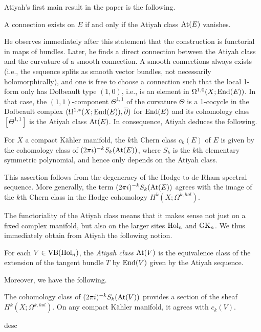 \documentclass[10pt]{amsart}
\begin{document}
Atiyah's first main result in the paper is the following.

\begin{prop}
A connection exists on $E$ if and only if the Atiyah class ${\rm At}(E)$ vanishes.
\end{prop}

He observes immediately after this statement that the construction is
functorial in maps of bundles. Later, he finds a direct connection
between the Atiyah class and the curvature of a smooth connection. A
smooth connections always exists (i.e., the sequence splits as smooth
vector bundles, not necessarily holomorphically), and one is free to
choose a connection such that the local 1-form only has
Dolbeault type $(1,0)$, i.e., is an element in $\Omega^{1,0}(X; {\rm End}(E))$. In that case, the $(1,1)$-component
$\Theta^{1,1}$ of the curvature $\Theta$ is a 1-cocycle in the
Dolbeault complex $(\Omega^{1,*}(X ; {\rm End}(E)), \overline{\partial})$ for ${\rm End}(E)$ and its cohomology class $[\Theta^{1,1}]$ is the Atiyah class ${\rm At}(E)$. In consequence, Atiyah deduces the following.

\begin{prop}
For $X$ a compact K\"ahler manifold, the $k$th Chern class $c_k(E)$ of $E$ is given by the cohomology class of $(2\pi i)^{-k} S_k({\rm At}(E))$, 
where $S_k$ is the $k$th elementary symmetric polynomial, and hence only depends on the Atiyah class.
\end{prop}

This assertion follows from the degeneracy of the Hodge-to-de Rham
spectral sequence. More generally, the term $(2\pi i)^{-k}
S_k({\rm At}(E))$ agrees with the image of the $k$th Chern class in the
Hodge cohomology $H^k(X ; \Omega^{k,hol})$.

The functoriality of the Atiyah class means that it makes sense not just on a fixed complex manifold, but also on the larger sites ${\rm Hol}_n$ and ${\rm GK}_n$. 
We thus immediately obtain from Atiyah the following notion.

\begin{dfn}
For each $V \in {\rm VB}({\rm Hol}_n)$, the {\em Atiyah class} ${\rm At}(V)$ is the equivalence class of the extension of the tangent bundle $T$ by ${\rm End}(V)$ given by the Atiyah sequence.
\end{dfn}

Moreover, we have the following.

\begin{lem}
The cohomology class of $(2\pi i)^{-k} S_k({\rm At}(V))$ provides a section
of the sheaf $H^k(X ; \Omega^{k,hol})$. On any compact K\"ahler manifold, it agrees with $c_k(V)$.
\end{lem}
desc
\end{document}
